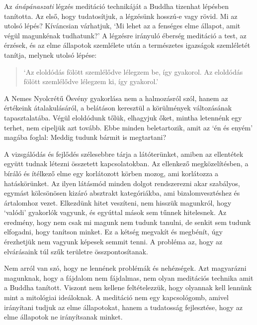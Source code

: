 Az \emph{ánápánaszati} légzés meditáció technikáját a Buddha tizenhat
lépésben tanította. Az első, hogy tudatosítjuk, a légzésünk hosszú-e
vagy rövid. Mi az utolsó lépés? Kíváncsian várhatjuk, `Mi lehet az a
fenséges elme állapot, amit végül magunkénak tudhatunk?' A légzésre
irányuló éberség meditáció a test, az érzések, és az elme állapotok
szemlélete után a természetes igazságok szemléletét tanítja, melynek
utolsó lépése:

\begin{quote}
`Az eloldódás fölött szemlélődve lélegzem be, így gyakorol. Az eloldódás
fölött szemlélődve lélegzem ki, így gyakorol.'

\bigskip

\end{quote}

A Nemes Nyolcrétű Ösvény gyakorlása nem a halmozásról szól, hanem az
értékeink átalakulásáról, a belátáson keresztül a körülmények
változásának tapasztalatába. Végül eloldódunk tőlük, elhagyjuk őket,
mintha letennénk egy terhet, nem cipeljük azt tovább. Ebbe minden
beletartozik, amit az `én és enyém' magába foglal: Meddig tudunk bármit
is megtartani?


A vizsgálódás és fejlődés szélesebbre tárja a látóterünket, amiben az
ellentétek együtt tudnak létezni összetett kapcsolatokban. Az ellenkező
megközelítésben, a bíráló és ítélkező elme egy korlátozott körben mozog,
ami korlátozza a hatáskörünket. Az ilyen látásmód minden dolgot
rendszerezni akar szabályos, egymást kölcsönösen kizáró absztrakt
kategóriákba, ami bizalomvesztéshez és ártalomhoz vezet. Elkezdünk hitet
veszíteni, nem hisszük magunkról, hogy `valódi' gyakorlók vagyunk, és
egyúttal mások sem tűnnek hitelesnek. Az eredmény, hogy nem csak mi
magunk nem tudunk tanulni, de senkit sem tudunk elfogadni, hogy tanítson
minket. Ez a kétség megvakít és megbénít, úgy érezhetjük nem vagyunk
képesek semmit tenni. A probléma az, hogy az elvárásaink túl szűk
területre összpontosítanak.

Nem arról van szó, hogy ne lennének problémák és nehézségek. Azt
magyarázni magunknak, hogy a fájdalom nem fájdalmas, nem olyan
meditációs technika amit a Buddha tanított. Viszont nem kellene
feltételezzük, hogy olyannak kell lennünk mint a mitológiai ideáloknak.
A meditáció nem egy kapcsológomb, amivel irányítani tudjuk az elme
állapotokat, hanem a tudatosság fejlesztése, hogy az elme állapotok ne
irányítsanak minket.

